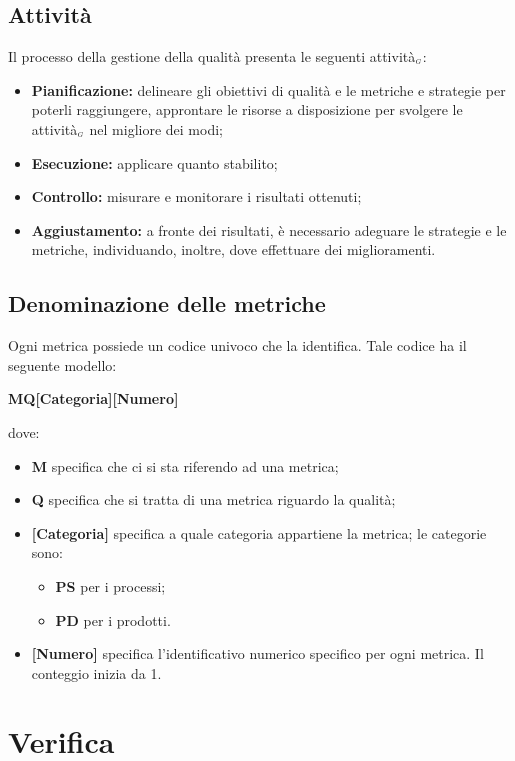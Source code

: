 \subsection{Attività} \label{ProcessiDiSupportoGestioneDellaQualitàAttività}
Il processo della gestione della qualità presenta le seguenti attività$_{\scaleto{G}{3pt}}$:
\begin{itemize}
	\item \textbf{Pianificazione:} delineare gli obiettivi di qualità e le metriche e strategie per poterli raggiungere, approntare le risorse a disposizione per svolgere le attività$_{\scaleto{G}{3pt}}$ nel migliore dei modi;
	\item \textbf{Esecuzione:} applicare quanto stabilito;
	\item \textbf{Controllo:} misurare e monitorare i risultati ottenuti;
	\item \textbf{Aggiustamento:} a fronte dei risultati, è necessario adeguare le strategie e le metriche, individuando, inoltre, dove effettuare dei miglioramenti.
\end{itemize}
\subsection{Denominazione delle metriche} \label{ProcessiDiSupportoGestioneDellaQualitàDenominazioneDelleMetriche}
Ogni metrica possiede un codice univoco che la identifica. Tale codice ha il seguente modello:
\begin{center}
	\textbf {MQ[Categoria][Numero]}
\end{center}
dove:
\begin{itemize}
	 \item \textbf {M} specifica che ci si sta riferendo ad una metrica;
	 \item \textbf {Q} specifica che si tratta di una metrica riguardo la qualità;
	 \item \textbf {[Categoria]} specifica a quale categoria appartiene la metrica; le categorie sono:
	 \begin{itemize}
		 \item \textbf{PS} per i processi;
		 \item \textbf{PD} per i prodotti.
	 \end{itemize}
	\item \textbf {[Numero]} specifica l’identificativo numerico specifico per ogni metrica. Il conteggio inizia da 1.
\end{itemize}

\section{Verifica}\label{ProcessiDiSupportoVerifica}

